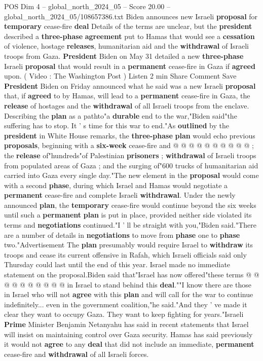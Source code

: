\begin{textsample}{POS Dim 4 – global\_north\_2024\_05 – Score 20.00 – global\_north\_2024\_05/108657386.txt}  \label{ex:f4_pos_345}
Biden announces new Israeli \textbf{proposal} for \textbf{temporary} cease-fire \textbf{deal} Details of the terms are unclear, but the \textbf{president} described a \textbf{three-phase} \textbf{agreement} put to Hamas that would see a \textbf{cessation} of violence, hostage \textbf{releases}, humanitarian aid and the \textbf{withdrawal} of Israeli troops from Gaza. \textbf{President} Biden on May 31 detailed a new \textbf{three-phase} Israeli \textbf{proposal} that would result in a \textbf{permanent} cease-fire in Gaza if \textbf{agreed} upon. ( Video : The Washington Post ) Listen 2 min Share Comment Save \textbf{President} Biden on Friday announced what he said was a new Israeli \textbf{proposal} that, if \textbf{agreed} to by Hamas, will lead to a \textbf{permanent} cease-fire in Gaza, the \textbf{release} of hostages and the \textbf{withdrawal} of all Israeli troops from the enclave.
Describing the \textbf{plan} as a pathto"a \textbf{durable} end to the war,"Biden said"the suffering has to stop.
It ' s time for this war to end."As \textbf{outlined} by the \textbf{president} in White House remarks, the \textbf{three-phase} \textbf{plan} would echo previous \textbf{proposals}, beginning with a \textbf{six-week} cease-fire and @ @ @ @ @ @ @ @ @ @ ; the \textbf{release} of"hundreds"of Palestinian \textbf{prisoners} ; \textbf{withdrawal} of Israeli troops from populated areas of Gaza ; and the surging of"600 trucks of humanitarian aid carried into Gaza every single day."The new element in the \textbf{proposal} would come with a second \textbf{phase}, during which Israel and Hamas would negotiate a \textbf{permanent} cease-fire and complete Israeli \textbf{withdrawal}.
Under the newly announced \textbf{plan}, the \textbf{temporary} cease-fire would continue beyond the six weeks until such a \textbf{permanent} \textbf{plan} is put in place, provided neither side violated its terms and \textbf{negotiations} continued."I ' ll be straight with you,"Biden said."There are a number of details in \textbf{negotiations} to move from \textbf{phase} one to \textbf{phase} two."Advertisement The \textbf{plan} presumably would require Israel to \textbf{withdraw} its troops and cease its current offensive in Rafah, which Israeli officials said only Thursday could last until the end of this year.
Israel made no immediate statement on the proposal.Biden said that"Israel has now offered"these terms @ @ @ @ @ @ @ @ @ @ in Israel to stand behind this \textbf{deal}.""I know there are those in Israel who will not \textbf{agree} with this \textbf{plan} and will call for the war to continue indefinitely... even in the government coalition,"he said."And they ' ve made it clear they want to occupy Gaza.
They want to keep fighting for years."Israeli \textbf{Prime} Minister Benjamin Netanyahu has said in recent statements that Israel will insist on maintaining control over Gaza security.
Hamas has said previously it would not \textbf{agree} to any \textbf{deal} that did not include an immediate, \textbf{permanent} cease-fire and \textbf{withdrawal} of all Israeli forces.


\end{textsample}
